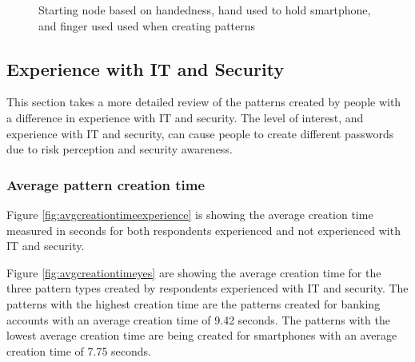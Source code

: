\begin{figure}[H]
{          \label{fig:handednessstartingpoint3}
        }
        \hspace{0.5cm}
        \caption{Starting node based on handedness, hand used to hold smartphone, and finger used used when creating patterns}
        \label{fig:handednessstartingpoint}
      \end{figure}

  \clearpage
	\subsection{Experience with IT and Security}

    This section takes a more detailed review of the patterns created by people with a difference in experience with IT and security. The level of interest, and experience with IT and security, can cause people to create different passwords due to risk perception and security awareness.  

    \subsubsection{Average pattern creation time}
    Figure \ref{fig:avgcreationtimeexperience} is showing the average creation time measured in seconds for both respondents experienced and not experienced with IT and security. 

    Figure \ref{fig:avgcreationtimeyes} are showing the average creation time for the three pattern types created by respondents experienced with IT and security. The patterns with the highest creation time are the patterns created for banking accounts with an average creation time of 9.42 seconds. The patterns with the lowest average creation time are being created for smartphones with an average creation time of 7.75 seconds. 

